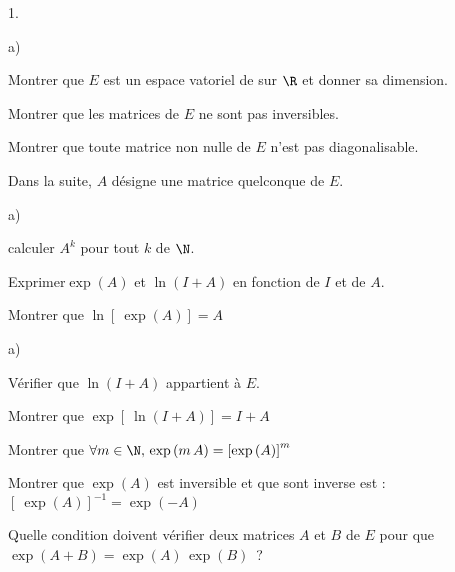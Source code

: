 \documentclass[11pt]{article}%
\begin{document}
\begin{noliste}{1.}
 \setlength{\itemsep}{4mm}
\item 
\begin{noliste}{a)}
 \setlength{\itemsep}{2mm}
\item Montrer que $E$ est un espace vatoriel de sur $\R$ et donner
sa dimension.

\item Montrer que les matrices de $E$ ne sont pas inversibles.

\item Montrer que toute matrice non nulle de $E$ n'est pas
diagonalisable.
\end{noliste}

Dans la suite, $A$ désigne une matrice quelconque de $E.$

\item 
\begin{noliste}{a)}
 \setlength{\itemsep}{2mm}
\item calculer $A^{k}$\hspace{-1cm} pour tout $k$ de $\N$.

\item Exprimer$\exp \left( A\right) $ et $\ln \left( I + A\right) $ en
fonction de $I$ et de $A.$
\end{noliste}

\item Montrer que $\ln \left[ \ \exp \left( A\right) \right] = A$

\item 
\begin{noliste}{a)}
 \setlength{\itemsep}{2mm}
\item Vérifier que $\ln \left( I + A\right) $ appartient à $E.$

\item Montrer que $\exp \left[ \ \ln \left( I + A\right) \right] = I +
A$
\end{noliste}

\item Montrer que $\forall m\in \N,\,\exp \left( m\,A\right) = \left[
\exp \left( A\right) \right] ^{m}$

\item Montrer que $\exp \left( A\right) $ est inversible et que sont
inverse
est : $\left[ \ \exp \left( A\right) \right] ^{-1} = \exp \left(
-A\right) $

\item Quelle condition doivent vérifier deux matrices $A$ et $B$ de $E$
pour que $\exp \left( A + B\right) = \exp \left( A\right) \,\exp \left(
B\right) $\ ?
\end{noliste}
\end{document}
